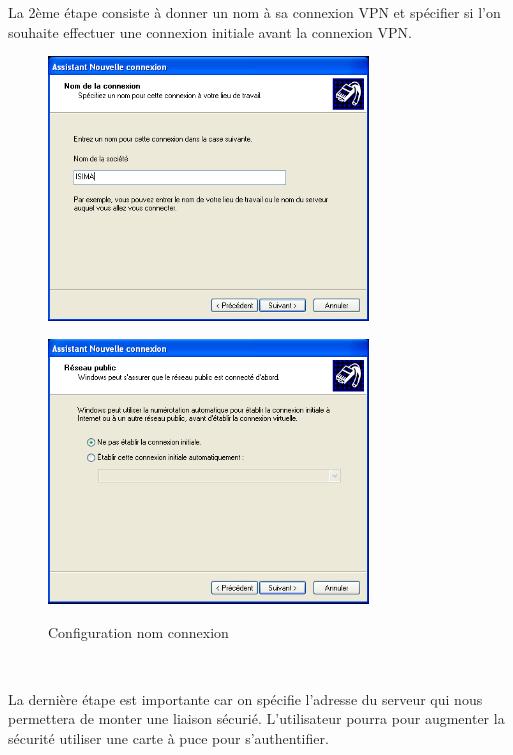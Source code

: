 La 2ème étape consiste à donner un nom à sa connexion VPN et spécifier si l'on souhaite effectuer une connexion initiale avant la connexion VPN.

\begin{figure}[H]
	\begin{minipage}{0.5\textwidth}
		\begin{flushleft} \large
			\includegraphics[height=7cm]{partie_2/screen_windows/etape3.PNG}\\
		\end{flushleft}
	\end{minipage}
	\begin{minipage}{0.43\textwidth}
		\begin{flushright} \large
			\includegraphics[height=7cm]{partie_2/screen_windows/etape4.PNG}\\
		\end{flushright}
	\end{minipage}
	\caption{Configuration nom connexion}
	\label{VPN_ETAPE2}
\end{figure}
~\


La dernière étape est importante car on spécifie l'adresse du serveur qui nous permettera de monter une liaison sécurié. L'utilisateur pourra pour augmenter la sécurité utiliser une carte à puce pour s'authentifier.

